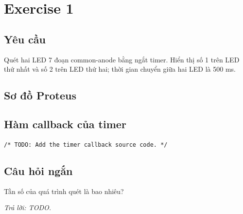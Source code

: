 
\section{Exercise 1}

\subsection{Yêu cầu}
Quét hai LED 7 đoạn common-anode bằng ngắt timer. Hiển thị số 1 trên LED thứ
nhất và số 2 trên LED thứ hai; thời gian chuyển giữa hai LED là 500 ms.

\subsection{Sơ đồ Proteus}

\subsection{Hàm callback của timer}
\begin{lstlisting}[caption={Timer callback -- Exercise 1}]
/* TODO: Add the timer callback source code. */
\end{lstlisting}

\subsection{Câu hỏi ngắn}
Tần số của quá trình quét là bao nhiêu?

\textit{Trả lời: TODO.}
